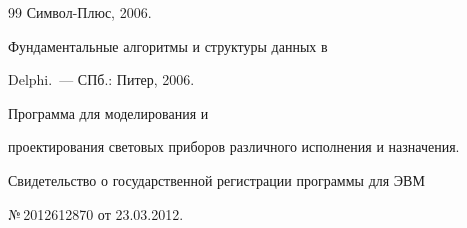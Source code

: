 {{\begin{thebibliography}{99}
Сим\-вол-Плюс, 2006.




 Фундаментальные алгоритмы и структуры данных в 


Delphi.~--- СПб.: Питер, 2006.





    \label{end\stat}


    




 Программа для моделирования и 


проектирования световых приборов различного исполнения и назначения. 


Свидетельство о государственной регистрации программы для ЭВМ 


№\,2012612870 от 23.03.2012.


 \end{thebibliography}


}


}


